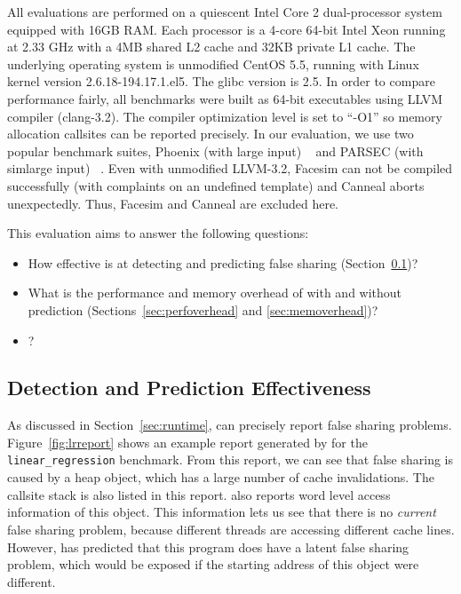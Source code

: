 \label{sec:evaluation}

All evaluations are performed on a quiescent Intel Core 2 dual-processor system equipped with 
16GB RAM. 
Each processor is a 4-core 64-bit Intel Xeon running at 2.33 GHz with a 4MB
shared L2 cache and 32KB private L1 cache. 
The underlying operating system is unmodified CentOS 5.5, running with Linux kernel
version 2.6.18-194.17.1.el5. The glibc version is 2.5. 
In order to compare performance fairly, all benchmarks were built as 64-bit executables 
using LLVM compiler (clang-3.2). The compiler optimization level is set to ``-O1'' 
so memory allocation callsites can be reported precisely.
In our evaluation, we use two popular benchmark suites,
Phoenix (with large input) ~\cite{phoenix-hpca} and PARSEC (with simlarge input) ~\cite{parsec}. Even with unmodified LLVM-3.2, Facesim can not be compiled successfully (with complaints on an undefined template) and Canneal aborts unexpectedly. Thus, Facesim and Canneal are excluded here. 

This evaluation aims to answer the following questions:
\begin{itemize}
\item
  How effective is \Predator{} at detecting and predicting false sharing (Section~\ref{sec:effective})?

\item
  What is the performance and memory overhead of \Predator{} with and without prediction
  (Sections~\ref{sec:perfoverhead} and \ref{sec:memoverhead})?

\item 
  ? 
 
\end{itemize}

\subsection{Detection and Prediction Effectiveness}
\label{sec:effective}

As discussed in Section~\ref{sec:runtime}, \Predator{} can precisely report  
false sharing problems. 
Figure~\ref{fig:lrreport} shows an example report generated by \Predator{} for the \texttt{linear\_regression} 
benchmark. From this report, we can see that false sharing is caused by a heap object, which
has a large number of cache invalidations. 
The callsite stack is also listed in this report. \Predator{} also reports word level access information
of this object. This information lets us see that there is no \emph{current} false sharing problem, because different threads are accessing different cache lines. However, \Predator{} has predicted that this program does 
have a latent false sharing problem, which would be exposed if the starting address of this object were different. 

